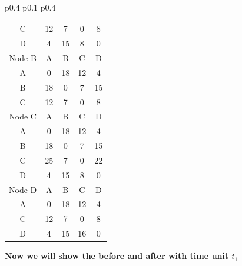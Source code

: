 \documentclass{article}
\begin{document}
\begin{tabular}{p{0.4\linewidth} p{0.1\linewidth} p{0.4\linewidth}}
\begin{tabular}{c|c|c|c|c}
    C & 12 & 7 & 0 & 8 \\
    D & 4 & 15 & 8 & 0 \\
    \hline
    \hline
    Node B & A & B & C & D \\
    \hline 
    A & 0 & 18 & 12 & 4 \\
    B & 18 & 0 & 7 & 15 \\
    C & 12 & 7 & 0 & 8 \\
    \hline
    \hline
    Node C & A & B & C & D \\
    \hline
    A & 0 & 18 & 12 & 4 \\
    B & 18 & 0 & 7 & 15 \\
    C & \color{red}25 & 7 & 0 & \color{red}22 \\
    D & 4 & 15 & 8 & 0 \\
    \hline
    \hline
    Node D & A & B & C & D \\
    \hline
    A & 0 & 18 & 12 & 4 \\
    C & 12 & 7 & 0 & 8 \\
    D & 4 & 15 & \color{red}16 & 0 \\
    \hline
\end{tabular}
\end{tabular}
\newline
\textbf{Now we will show the before and after with time unit $t_1$}\\
\newline
\end{document}

